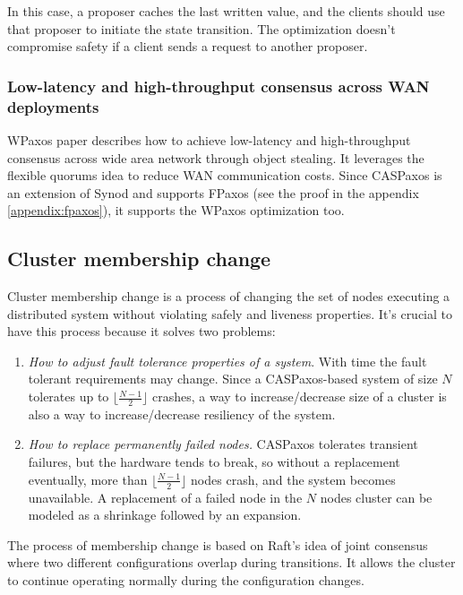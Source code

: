\documentclass[a4paper,USenglish]{lipics-v2018}
\theoremstyle{definition}
\begin{document}
    In this case, a proposer caches the last written value, and the clients should use that proposer to initiate the state transition. The optimization doesn't compromise safety if a client sends a request to another proposer.

\subsubsection{Low-latency and high-throughput consensus across WAN deployments}

    WPaxos\cite{wpaxos} paper describes how to achieve low-latency and high-throughput consensus across wide area network through object stealing. It leverages the flexible quorums\cite{fpaxos} idea to reduce WAN communication costs. Since CASPaxos is an extension of Synod and supports FPaxos (see the proof in the appendix \ref{appendix:fpaxos}), it supports the WPaxos optimization too.

\subsection{Cluster membership change}

    Cluster membership change is a process of changing the set of nodes executing a distributed system without violating safely and liveness properties. It's crucial to have this process because it solves two problems:

    \begin{enumerate}
    \item {\it How to adjust fault tolerance properties of a system}. With time the fault tolerant requirements may change. Since a CASPaxos-based system of size $N$ tolerates up to $\lfloor \frac{N-1}2 \rfloor$ crashes, a way to increase/decrease size of a cluster is also a way to increase/decrease resiliency of the system.

    \item {\it How to replace permanently failed nodes.} CASPaxos tolerates transient failures, but the hardware tends to break, so without a replacement eventually, more than $\lfloor \frac{N-1}2 \rfloor$ nodes crash, and the system becomes unavailable. A replacement of a failed node in the $N$ nodes cluster can be modeled as a shrinkage followed by an expansion.
    \end{enumerate}

    The process of membership change is based on Raft's idea of joint consensus where two different configurations overlap during transitions. It allows the cluster to continue operating normally during the configuration changes.
\end{document}
